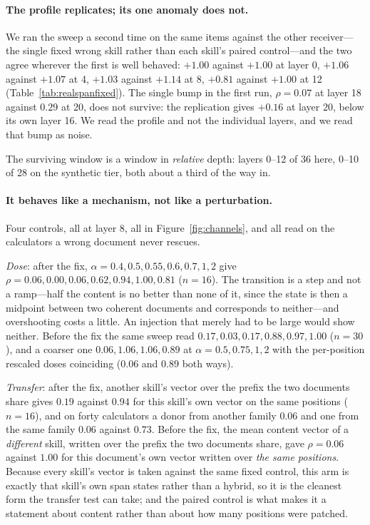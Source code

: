 \documentclass{article}
\begin{document}
\paragraph{The profile replicates; its one anomaly does not.} We ran the sweep a
second time on the same items against the other receiver---the single fixed
wrong skill rather than each skill's paired control---and the two agree wherever
the first is well behaved: $+1.00$ against $+1.00$ at layer 0, $+1.06$ against
$+1.07$ at 4, $+1.03$ against $+1.14$ at 8, $+0.81$ against $+1.00$ at 12
(Table~\ref{tab:realspanfixed}). The single bump in the first run, $\rho=0.07$
at layer 18 against $0.29$ at 20, does not survive: the replication gives $+0.16$
at layer 20, below its own layer 16. We read the profile and not the individual
layers, and we read that bump as noise.



The surviving window is a window in \emph{relative} depth: layers 0--12 of 36
here, 0--10 of 28 on the synthetic tier, both about a third of the way in.



\paragraph{It behaves like a mechanism, not like a perturbation.} Four
controls, all at layer $8$, all in Figure~\ref{fig:channels}, and all read on
the calculators a wrong document never rescues.

\emph{Dose}: after the fix, $\alpha = 0.4, 0.5, 0.55, 0.6, 0.7, 1, 2$ give
$\rho = 0.06, 0.00, 0.06, 0.62, 0.94, 1.00, 0.81$ ($n=16$). The transition is a
step and not a ramp---half the content is no better than none of it, since the
state is then a midpoint between two coherent documents and corresponds to
neither---and overshooting costs a little. An injection that merely had to be
large would show neither. Before the fix the same sweep read $0.17, 0.03, 0.17,
0.88, 0.97, 1.00$ ($n=30$), and a coarser one $0.06, 1.06, 1.06, 0.89$ at
$\alpha = 0.5, 0.75, 1, 2$ with the per-position rescaled doses coinciding
($0.06$ and $0.89$ both ways).

\emph{Transfer}: after the fix, another skill's vector over the prefix the two
documents share gives $0.19$ against $0.94$ for this skill's own vector on the
same positions ($n=16$), and on forty calculators a donor from another family
$0.06$ and one from the same family $0.06$ against $0.73$. Before the fix, the
mean content vector of a \emph{different} skill, written over the prefix the two
documents share, gave $\rho = 0.06$ against $1.00$ for
this document's own vector written over \emph{the same positions}. Because every
skill's vector is taken against the same fixed control, this arm is exactly that
skill's own span states rather than a hybrid, so it is the cleanest form the
transfer test can take; and the paired control is what makes it a statement about
content rather than about how many positions were patched.
\end{document}
